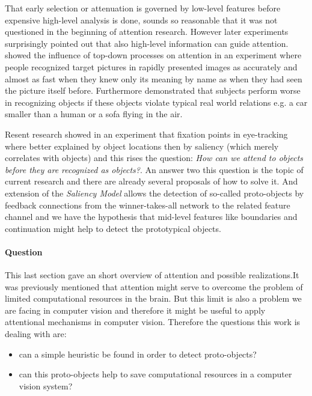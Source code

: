 That early selection or attenuation is governed by low-level features before expensive high-level analysis is done, sounds so reasonable that it was not questioned in the beginning of attention research. However later experiments surprisingly pointed out that also high-level information can guide attention. \cite{Potter:1975dr} showed the influence of top-down processes on attention in an experiment where people recognized target pictures in rapidly presented images as accurately and almost as fast when they knew only its meaning by name as when they had seen the picture itself before. Furthermore \cite{Biederman:1982um} demonstrated that subjects perform worse in recognizing objects if these objects violate typical real world relations e.g. a car smaller than a human or a sofa flying in the air.

Resent research \citep{Einhauser:2008cv} showed in an experiment that fixation points in eye-tracking where better explained by object locations then by saliency (which merely correlates with objects) and this rises the question: \emph{How can we attend to objects before they are recognized as objects?}. An answer two this question is the topic of current research and there are already several proposals of how to solve it. And extension of the \emph{Saliency Model} \citep{Walther:2006tg} allows the detection of so-called proto-objects by feedback connections from the winner-takes-all network to the related feature channel and we have the hypothesis that mid-level features like boundaries and continuation might help to detect the prototypical objects.


\paragraph{Question} %
\label{par:question}
This last section gave an short overview of attention and possible realizations.It was previously mentioned that attention might serve to overcome the problem of limited computational resources in the brain. But this limit is also a problem we are facing in computer vision and therefore it might be useful to apply attentional mechanisms in computer vision. Therefore the questions this work is dealing with are:

\begin{itemize}
    \item can a simple heuristic be found in order to detect proto-objects?
    \item can this proto-objects help to save computational resources in a computer vision system?
\end{itemize}

